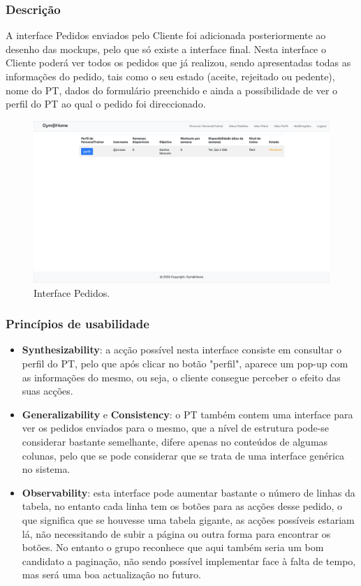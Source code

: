 \subsubsection{Descrição}
\hspace{5mm} A interface Pedidos enviados pelo Cliente foi adicionada posteriormente ao desenho das mockups, pelo que só existe a interface final. Nesta interface o Cliente poderá ver todos os pedidos que já realizou, sendo apresentadas todas as informações do pedido, tais como o seu estado (aceite, rejeitado ou pedente), nome do PT, dados do formulário preenchido e ainda a possibilidade de ver o perfil do PT ao qual o pedido foi direccionado.

\begin{figure}[H]
    \centering
    \includegraphics[scale=0.25]{images/interfaces/client_meus_pedidos.png}
    \caption{Interface Pedidos.}
    \label{fig:interfacepedidos}
\end{figure}

\subsubsection{Princípios de usabilidade}
\begin{itemize}
    \item \textbf{Synthesizability}: a acção possível nesta interface consiste em consultar o perfil do PT, pelo que após clicar no botão "perfil", aparece um pop-up com as informações do mesmo, ou seja, o cliente consegue perceber o efeito das suas acções.
    \item \textbf{Generalizability} e \textbf{Consistency}: o PT também contem uma interface para ver os pedidos enviados para o mesmo, que a nível de estrutura pode-se considerar bastante semelhante, difere apenas no conteúdos de algumas colunas, pelo que se pode considerar que se trata de uma interface genérica no sistema. 
    \item \textbf{Observability}: esta interface pode aumentar bastante o número de linhas da tabela, no entanto cada linha tem os botões para as acções desse pedido, o que significa que se houvesse uma tabela gigante, as acções possíveis estariam lá, não necessitando de subir a página ou outra forma para encontrar os botões. No entanto o grupo reconhece que aqui também seria um bom candidato a paginação, não sendo possível implementar face à falta de tempo, mas será uma boa actualização no futuro.
\end{itemize}

